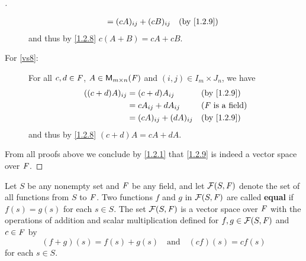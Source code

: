 \begin{proof}[]
\begin{description}
\begin{align*}
				                  & = (cA)_{i j} + (cB)_{i j} &  & \text{(by \cref{1.2.9})}
			\end{align*}
			and thus by \cref{1.2.8} \(c (A + B) = cA + cB\).
		\item[For \ref{vs8}:]
			For all \(c, d \in \mathit{F}\), \(A \in \mathsf{M}_{{m} \times n}({\mathit{F}})\) and \((i, j) \in I_m \times J_n\), we have
			\begin{align*}
				((c + d) A)_{i j} & = (c + d) A_{i j}         &  & \text{(by \cref{1.2.9})}   \\
				                  & = c A_{i j} + d A_{i j}   &  & \text{(\(\F\) is a field)} \\
				                  & = (cA)_{i j} + (dA)_{i j} &  & \text{(by \cref{1.2.9})}
			\end{align*}
			and thus by \cref{1.2.8} \((c + d) A = cA + dA\).
	\end{description}
	From all proofs above we conclude by \cref{1.2.1} that \cref{1.2.9} is indeed a vector space over \(\mathit{F}\).
\end{proof}

\begin{eg}\label{1.2.10}
	Let \(S\) be any nonempty set and \(\mathit{F}\) be any field, and let \(\FS\) denote the set of all functions from \(S\) to \(\mathit{F}\).
	Two functions \(f\) and \(g\) in \(\FS\) are called \textbf{equal} if \(f(s) = g(s)\) for each \(s \in S\).
	The set \(\FS\) is a vector space over \(\mathit{F}\) with the operations of addition and scalar multiplication defined for \(f, g \in \FS\) and \(c \in \mathit{F}\) by
	\[
		(f + g)(s) = f(s) + g(s) \quad \text{and} \quad (cf)(s) = cf(s)
	\]
	for each \(s \in S\).
\end{eg}

